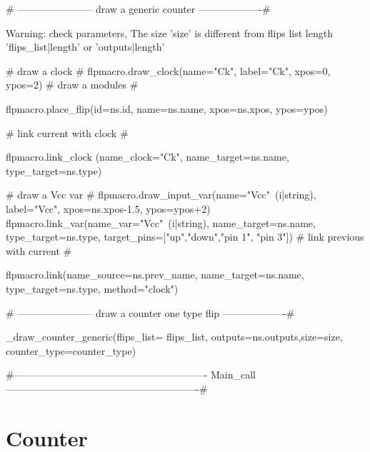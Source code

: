 {%
{%
{# -----------------------
 draw a generic counter
-------------------#}
{%

{%
 Warning: check parameters, The size '{{size}}' is different from flips list length '{{flips_list|length}}' or
 '{{outputs|length}}'
{%
    {# draw a clock #}
    {{ flpmacro.draw_clock(name="Ck", label="Ck", xpos=0, ypos=2)}}
    {# draw a modules #}
    {%
    {%
    {%
        {%
        {%
        {%
        {%
        {{ flpmacro.place_flip(id=ns.id, name=ns.name, xpos=ns.xpos, ypos=ypos)}}

        {# link current with clock #}
        {%
        {{ flpmacro.link_clock (name_clock="Ck", name_target=ns.name, type_target=ns.type)}}
        {%

        {# draw a Vcc var #}
        {{ flpmacro.draw_input_var(name="Vcc"~(i|string), label="Vcc", xpos=ns.xpos-1.5, ypos=ypos+2)}}
        {{ flpmacro.link_var(name_var="Vcc"~(i|string), name_target=ns.name, type_target=ns.type, target_pins=["up","down","pin 1", "pin 3"])}}
        {# link previous with current #}
        {%
            {{ flpmacro.link(name_source=ns.prev_name, name_target=ns.name, type_target=ns.type, method="clock")}}
        {%
        {%
        {%
    {%

{%
{%

{# -----------------------
 draw a counter one type flip
-------------------#}
{%
{%
{%
{%
    {%
{%
{{ _draw_counter_generic(flips_list= flips_list, outputs=ns.outputs,size=size, counter_type=counter_type)}}

{%
{#----------------------------------------------------------
 Main_call
----------------------------------------------------------#}
\section{Counter}

}}}}}}}}}}}}}}}}}}}}}}}}}}}}
